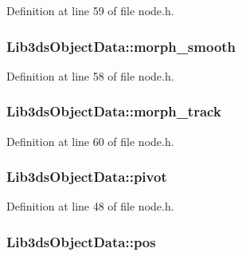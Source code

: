 Definition at line 59 of file node.\-h.

\hypertarget{struct_lib3ds_object_data_ad1bfb517e5f8fc4ba4f9e2aec521683d}{
\subsubsection[{morph\-\_\-smooth}]{ Lib3ds\-Object\-Data\-::morph\-\_\-smooth}}\label{struct_lib3ds_object_data_ad1bfb517e5f8fc4ba4f9e2aec521683d}


Definition at line 58 of file node.\-h.

\hypertarget{struct_lib3ds_object_data_a46745aa4e6ad1bb14f43eaab8bba72e3}{
\subsubsection[{morph\-\_\-track}]{ Lib3ds\-Object\-Data\-::morph\-\_\-track}}\label{struct_lib3ds_object_data_a46745aa4e6ad1bb14f43eaab8bba72e3}


Definition at line 60 of file node.\-h.

\hypertarget{struct_lib3ds_object_data_a0bac804605a6b17445451b3dddb91e50}{
\subsubsection[{pivot}]{ Lib3ds\-Object\-Data\-::pivot}}\label{struct_lib3ds_object_data_a0bac804605a6b17445451b3dddb91e50}


Definition at line 48 of file node.\-h.

\hypertarget{struct_lib3ds_object_data_a4d9a104fd664608bbcb8c905317f95a9}{
\subsubsection[{pos}]{ Lib3ds\-Object\-Data\-::pos}}\label{struct_lib3ds_object_data_a4d9a104fd664608bbcb8c905317f95a9}


